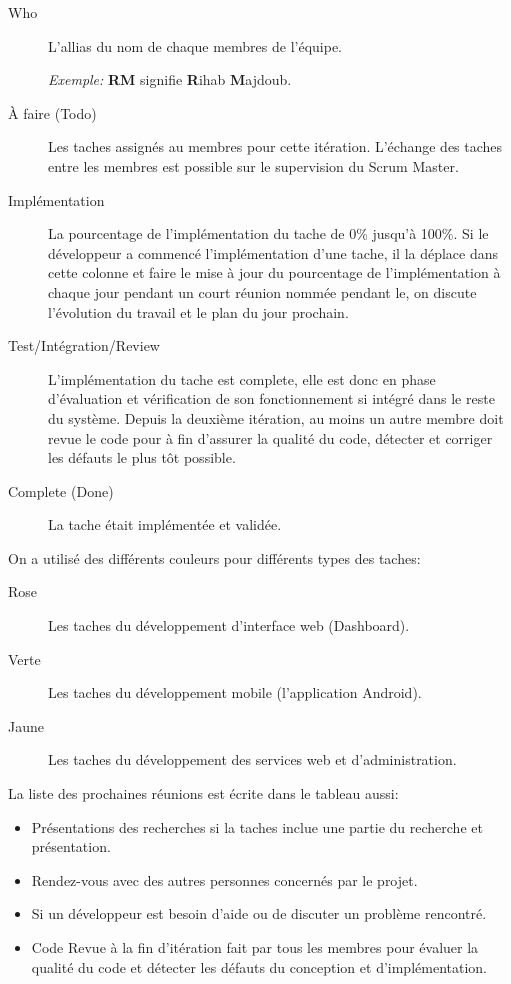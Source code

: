 \begin{description}
    \item [Who] L'allias du nom de chaque membres de l'équipe.

        \emph{Exemple:} \textbf{RM} signifie \textbf{R}ihab \textbf{M}ajdoub.
    \item [À faire (Todo)] Les taches assignés au membres pour cette itération.
        L'échange des taches entre les membres est possible sur le supervision
        du Scrum Master.
    \item [Implémentation] La pourcentage de l'implémentation du tache de 0\%
        jusqu'à 100\%. Si le développeur a commencé l'implémentation d'une
        tache, il la déplace dans cette colonne et faire le mise à jour du
        pourcentage de l'implémentation à chaque jour pendant un court réunion
        nommée  pendant le, on discute l'évolution du
        travail et le plan du jour prochain.
    \item [Test/Intégration/Review] L'implémentation du tache est complete,
        elle est donc en phase d'évaluation et vérification de son
        fonctionnement si intégré dans le reste du système. Depuis la deuxième
        itération, au moins un autre membre doit revue le code pour à fin
        d'assurer la qualité du code, détecter et corriger les défauts le plus
        tôt possible.
    \item [Complete (Done)] La tache était implémentée et validée.
\end{description}

On a utilisé des différents couleurs pour différents types des taches:

\begin{description}
    \item [Rose] Les taches du développement d'interface web (Dashboard).
    \item [Verte] Les taches du développement mobile (l'application Android).
    \item [Jaune] Les taches du développement des services web et d'administration.
\end{description}

La liste des prochaines réunions est écrite dans le tableau aussi:

\begin{itemize}
    \item Présentations des recherches si la taches inclue une partie du
        recherche et présentation.
    \item Rendez-vous avec des autres personnes concernés par le projet.
    \item Si un développeur est besoin d'aide ou de discuter un problème
        rencontré.
    \item Code Revue à la fin d'itération fait par tous les membres pour
        évaluer la qualité du code et détecter les défauts du conception et
        d'implémentation.
\end{itemize}

